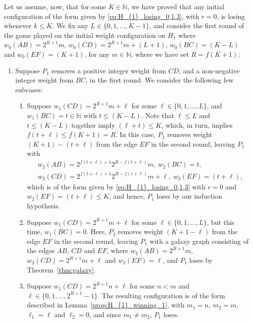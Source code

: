 \documentclass[11pt,reqno]{amsart}
\theoremstyle{definition}
\theoremstyle{definition}
\begin{document}
Let us assume, now, that for some $K \in \mathbb{N}$, we have proved that any initial configuration of the form given by \eqref{eq:H_{1}_losing_0,1,3}, with $r=0$, is losing whenever $k\leqslant K$. We fix any $L \in \{0,1,\ldots,K-1\}$, and consider the first round of the game played on the initial weight configuration on $H_{1}$ where $w_{0}(AB)=2^{R+1}m$, $w_{0}(CD)=2^{R+1}m+(L+1)$, $w_{0}(BC)=(K-L)$ and $w_{0}(EF)=(K+1)$, for any $m \in \mathbb{N}$, where we have set $R=f(K+1)$:
\begin{enumerate}
\item Suppose $P_{1}$ removes a positive integer weight from $CD$, and a non-negative integer weight from $BC$, in the first round. We consider the following few subcases:
\begin{enumerate}
\item Suppose $w_{1}(CD)=2^{R+1}m+\ell$ for some $\ell \in \{0,1,\ldots,L\}$, and $w_{1}(BC)=t \in \mathbb{N}$ with $t\leqslant (K-L)$. Note that $\ell \leqslant L$ and $t \leqslant (K-L)$ together imply $(\ell+t)\leqslant K$, which, in turn, implies $f(t+\ell)\leqslant f(K+1)=R$. In this case, $P_{2}$ removes weight $(K+1)-(t+\ell)$ from the edge $EF$ in the second round, leaving $P_{1}$ with 
\begin{align}
{}&w_{2}(AB)=2^{f(t+\ell)+1}2^{R-f(t+\ell)}m,\ w_{2}(BC)=t,\nonumber\\
{}&w_{2}(CD)=2^{f(t+\ell)+1}2^{R-f(t+\ell)}m+\ell,\ w_{2}(EF)=(t+\ell),\nonumber
\end{align}
which is of the form given by \eqref{eq:H_{1}_losing_0,1,3} with $r=0$ and $w_{2}(EF)=(t+\ell)\leqslant K$, and hence, $P_{1}$ loses by our induction hypothesis.

\item Suppose $w_{1}(CD)=2^{R+1}m+\ell$ for some $\ell \in \{0,1,\ldots,L\}$, but this time, $w_{1}(BC)=0$. Here, $P_{2}$ removes weight $(K+1-\ell)$ from the edge $EF$ in the second round, leaving $P_{1}$ with a galaxy graph consisting of the edges $AB$, $CD$ and $EF$, where $w_{2}(AB)=2^{R+1}m$, $w_{2}(CD)=2^{R+1}m+\ell$ and $w_{2}(EF)=\ell$, and $P_{1}$ loses by Theorem~\ref{thm:galaxy}.

\item Suppose $w_{1}(CD)=2^{R+1}n+\ell$ for some $n < m$ and $\ell \in \{0,1,\ldots,2^{R+1}-1\}$. The resulting configuration is of the form described in Lemma~\ref{prop:H_{1}_winning_1}, with $m_{1}=n$, $m_{2}=m$, $\ell_{1}=\ell$ and $\ell_{2}=0$, and since $m_{1}\neq m_{2}$, $P_{1}$ loses.
\end{enumerate}


\end{enumerate}
\end{document}
